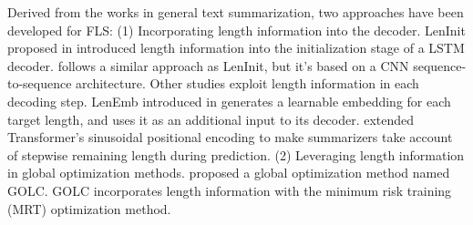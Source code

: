 \documentclass[11pt,a4paper]{article}
\begin{document}
Derived from the works in general text summarization, two approaches have been developed for FLS: (1) Incorporating length information into the decoder. LenInit proposed in \citet{kikuchi-etal-2016-controlling} introduced length information into the initialization stage of a LSTM decoder. \citet{liu-etal-2018-controlling} follows a similar approach as LenInit, but it's based on a CNN sequence-to-sequence architecture. Other studies exploit length information in each decoding step. LenEmb introduced in \citet{kikuchi-etal-2016-controlling} generates a learnable embedding for each target length, and uses it as an additional input to its decoder. \citet{takase-okazaki-2019-positional} extended Transformer's sinusoidal positional encoding \citep{DBLP:conf/nips/VaswaniSPUJGKP17} to make summarizers take account of stepwise remaining length during prediction. (2) Leveraging length information in global optimization methods. \citet{makino-etal-2019-global} proposed a global optimization method named GOLC. GOLC incorporates length information with the minimum risk training (MRT) optimization method.

\end{document}
